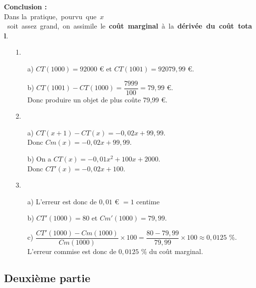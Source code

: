 \vspace*{.3cm}

\textbf{Conclusion :} \\ Dans \hbox{la pratique, pourvu que $x$ soit assez grand, on assimile le \textbf{coût marginal} à la \textbf{dérivée du coût total}.}

\vspace*{.3cm}

\begin{itemize}
\item[1.] 
\begin{itemize}
\item[a)] $CT(1000) = 92 000$ € et $CT(1001) = 92 079,99$ €. \\
\item[b)] $CT(1001) - CT(1000) = \dfrac{7999}{100} = 79,99$ €. \\ Donc produire un objet de plus coûte 79,99 €. \\
\end{itemize}
\item[2.] 
\begin{itemize}
\item[a)] $CT(x+1) - CT(x) = -0,02x + 99,99$. \\ Donc $Cm(x) = -0,02x + 99,99$. \\
\item[b)] On a $CT(x) = -0,01x^2 + 100x + 2000$. \\ Donc $CT'(x) = -0,02x + 100$. \\
\end{itemize}
\item[3.] 
\begin{itemize}
\item[a)] L'erreur est donc de $0,01$ € $ = 1$ centime \\
\item[b)] $CT'(1000) = 80$ et $Cm'(1000) = 79,99$. \\  
\item[c)] $\dfrac{CT'(1000) - Cm(1000)}{Cm(1000)} \times 100 = \dfrac{80 - 79,99}{79,99} \times 100 \approx 0,0125$ \%. \vspace*{.3cm} \\ L'erreur commise est donc de $0,0125$ \% du coût marginal. 
\end{itemize}
\end{itemize}

\newpage

\subsection{Deuxième partie}

